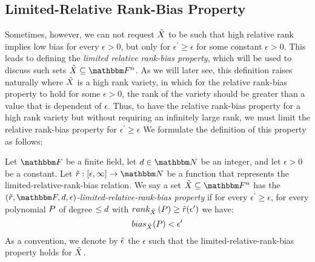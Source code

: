 \subsection[Limited Relative Rank-Bias Property]{Limited-Relative Rank-Bias Property}\label{subsec:limited-relative-rank-bias-property}
Sometimes, however, we can not request ${\tilde{X}}$ to be such that high relative rank implies low bias for every $\epsilon > 0$,
but only for $\epsilon^\prime \geq \epsilon$ for some constant $\epsilon > 0$.
This leads to defining the \emph{limited relative rank-bias property}, which will be used to discuss such sets $\variety \subseteq \field$.
\newline
As we will later see, this definition raises naturally where ${\tilde{X}}$ is a high rank variety,
in which for the relative rank-bias property to hold for some $\epsilon > 0$, the rank of the variety should be greater than a value that is dependent of $\epsilon$.
Thus, to have the relative rank-bias property for a high rank variety but without requiring an infinitely large rank, we must limit the relative rank-bias property for $\epsilon^\prime \geq \epsilon$
We formulate the definition of this property as follows:
\begin{definition}
    Let $\basefield$ be a finite field, let $\degree \in \naturalnumbersset$ be an integer, and let $\epsilon > 0$ be a constant.
    Let $\funcdef{\rankbiasfunc}{[\epsilon, \infty]}{\naturalnumbersset}$ be a function that represents the limited-relative-rank-bias relation.
    \newline
    We say a set $\variety \subseteq \field$ has the \emph{$(\rankbiasfunc, \basefield, \degree, \epsilon)$-limited-relative-rank-bias property} if
    for every $\epsilon^\prime \geq \epsilon$,
    for every polynomial $\genpoly$ of degree $\leq d$ with $\relrank{\variety}{\genpoly} \geq \rankbiasfunc(\epsilon^\prime)$ we have:
    \[
        \relbias{\variety}{\genpoly} < \epsilon^{\prime}
    \]
    As a convention, we denote by ${\tilde{\epsilon}}$ the $\epsilon$ such that the limited-relative-rank-bias property holds for ${\tilde{X}}$.
\end{definition}

